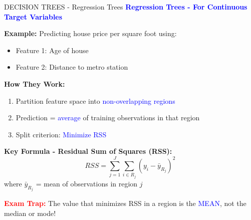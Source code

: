 \documentclass[8pt]{beamer}
\begin{document}
	\begin{frame}{DECISION TREES - Regression Trees}
		\fontsize{6.5}{7.5}\selectfont
		\textcolor{blue}{\textbf{Regression Trees - For Continuous Target Variables}}
		
		\textbf{Example:} Predicting house price per square foot using:
		\begin{itemize}
			\item Feature 1: Age of house
			\item Feature 2: Distance to metro station
		\end{itemize}
		
		\textbf{How They Work:}
		\begin{enumerate}
			\item Partition feature space into \textcolor{blue}{non-overlapping regions}
			\item Prediction = \textcolor{blue}{average} of training observations in that region
			\item Split criterion: \textcolor{blue}{Minimize RSS}
		\end{enumerate}
		
		\textbf{Key Formula - Residual Sum of Squares (RSS):}
		\[
		RSS = \sum_{j=1}^J \sum_{i \in R_j} (y_i - \bar{y}_{R_j})^2
		\]
		where $\bar{y}_{R_j}$ = mean of observations in region $j$
		
		\textcolor{red}{\textbf{Exam Trap:}} The value that minimizes RSS in a region is the \textcolor{blue}{MEAN}, not the median or mode!
	\end{frame}
	
\end{document}
